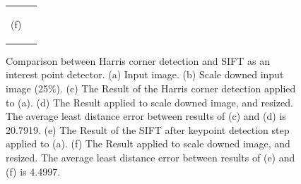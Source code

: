 \documentclass{article}
\begin{document}
\begin{figure}[p]
\begin{center}
\begin{tabular}{@{} cc @{}}
\begin{minipage}{0.5\hsize}
\begin{center}
          (f)
        \end{center}    
      \end{minipage}    \\
    \end{tabular}
    \caption{
      Comparison between Harris corner detection and SIFT as an interest point detector. 
      (a) Input image. 
      (b) Scale downed input image (25\%). 
      (c) The Result of the Harris corner detection applied to (a). 
      (d) The Result applied to scale downed image, and resized. 
      The average least distance error between results of (c) and (d) is 20.7919. 
      (e) The Result of the SIFT after keypoint detection step applied to (a). 
      (f) The Result applied to scale downed image, and resized.  
      The average least distance error between results of (e) and (f) is 4.4997. 
    }
    \label{Fi:EXPINT}
  \end{center}
\end{figure} 

\end{document}
